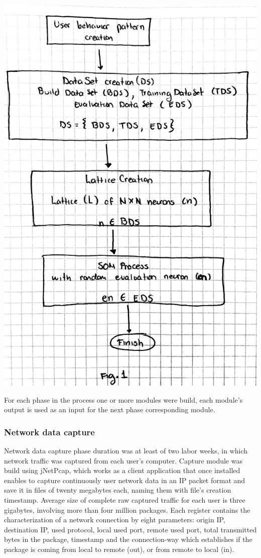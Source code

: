 \documentclass{article}
\begin{document}
	\begin{center}\includegraphics[scale=0.2]{fig-two} \end{center}

For each phase in the process one or more modules were build, each module's output is used as an input for the next phase corresponding module.


\subsubsection{Network data capture} %
Network data capture phase duration was at least of two labor weeks,  in which network traffic was captured from each user's computer.
Capture module was build using jNetPcap, which works as a client application that once installed enables to capture continuously user network data in an IP packet format and save it in files of twenty megabytes each, naming them with file's creation timestamp. Average size of complete raw captured traffic for each user is three gigabytes, involving more than four million packages. Each register contains the characterization of a network connection by eight parameters: origin IP, destination IP, used protocol, local used port, remote used port, total transmitted bytes in the package, timestamp and the connection-way which establishes if the package is coming from local to remote (out), or from remote to local (in).
\end{document}
